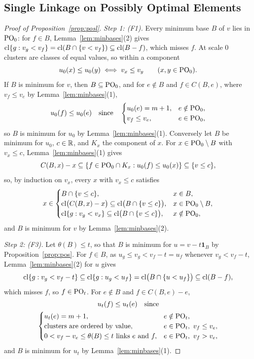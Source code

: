 \subsection{Single Linkage on Possibly Optimal Elements}
\label{app:posl}

\begin{proof}[Proof of Proposition~\ref{prop:posl}]
\emph{Step 1: (F1).}  Every minimum base $B$ of $v$ lies in $\mathrm{PO}_0$: for $f\in B$,
Lemma~\ref{lem:minbases}(2) gives $\operatorname{cl}\{g:v_g<v_f\}=\operatorname{cl}(B\cap\{v<v_f\})\subseteq\operatorname{cl}(B-f)$,
which misses $f$.  At scale $0$ clusters are classes of equal values, so within a
component
\[
  u_0(x)\le u_0(y)\iff v_x\le v_y\qquad(x,y\in\mathrm{PO}_0).
\]
If $B$ is minimum for $v$, then $B\subseteq\mathrm{PO}_0$, and for $e\notin B$ and
$f\in C(B,e)$, where $v_f\le v_e$ by Lemma~\ref{lem:minbases}(1),
\[
  u_0(f)\le u_0(e)\quad\text{since}\quad
  \begin{cases}
    u_0(e)=m+1,&e\notin\mathrm{PO}_0,\\
    v_f\le v_e,&e\in\mathrm{PO}_0,
  \end{cases}
\]
so $B$ is minimum for $u_0$ by Lemma~\ref{lem:minbases}(1).  Conversely let $B$ be
minimum for $u_0$, $c\in\mathbb R$, and $K_x$ the component of $x$.  For
$x\in\mathrm{PO}_0\setminus B$ with $v_x\le c$, Lemma~\ref{lem:minbases}(1) gives
\[
  C(B,x)-x\subseteq\{f\in\mathrm{PO}_0\cap K_x:u_0(f)\le u_0(x)\}\subseteq\{v\le c\},
\]
so, by induction on $v_x$, every $x$ with $v_x\le c$ satisfies
\[
  x\in\begin{cases}
    B\cap\{v\le c\},&x\in B,\\
    \operatorname{cl}\bigl(C(B,x)-x\bigr)\subseteq\operatorname{cl}\bigl(B\cap\{v\le c\}\bigr),&x\in\mathrm{PO}_0\setminus B,\\
    \operatorname{cl}\{g:v_g<v_x\}\subseteq\operatorname{cl}\bigl(B\cap\{v\le c\}\bigr),&x\notin\mathrm{PO}_0,
  \end{cases}
\]
and $B$ is minimum for $v$ by Lemma~\ref{lem:minbases}(2).

\emph{Step 2: (F3).}  Let $\theta(B)\le t$, so that $B$ is minimum for
$u=v-t\mathbf 1_B$ by Proposition~\ref{prop:pos}.  For $f\in B$, as
$u_g\le v_g<v_f-t=u_f$ whenever $v_g<v_f-t$, Lemma~\ref{lem:minbases}(2) for $u$
gives
\[
  \operatorname{cl}\{g:v_g<v_f-t\}\subseteq\operatorname{cl}\{g:u_g<u_f\}=\operatorname{cl}\bigl(B\cap\{u<u_f\}\bigr)\subseteq\operatorname{cl}(B-f),
\]
which misses $f$, so $f\in\mathrm{PO}_t$.  For $e\notin B$ and $f\in C(B,e)-e$,
\[
  \begin{gathered}
  u_t(f)\le u_t(e)\quad\text{since}\\
  \begin{cases}
    u_t(e)=m+1,&e\notin\mathrm{PO}_t,\\
    \text{clusters are ordered by value},&e\in\mathrm{PO}_t,\ v_f\le v_e,\\
    0<v_f-v_e\le\theta(B)\le t\text{ links }e\text{ and }f,&e\in\mathrm{PO}_t,\ v_f>v_e,
  \end{cases}
  \end{gathered}
\]
and $B$ is minimum for $u_t$ by Lemma~\ref{lem:minbases}(1).


\end{proof}
